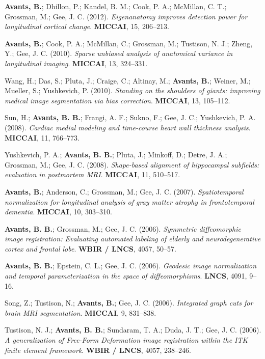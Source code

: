 \documentclass[10pt,letterpaper]{article}
\begin{document}
\begin{enumerate}
{  \item \textbf{Avants, B.}; Dhillon, P.; Kandel, B. M.; Cook, P. A.; McMillan, C. T.; Grossman, M.; Gee, J. C. (2012). \textit{Eigenanatomy improves detection power for longitudinal cortical change}. \textbf{MICCAI}, 15, 206--213.
  \item \textbf{Avants, B.}; Cook, P. A.; McMillan, C.; Grossman, M.; Tustison, N. J.; Zheng, Y.; Gee, J. C. (2010). \textit{Sparse unbiased analysis of anatomical variance in longitudinal imaging}. \textbf{MICCAI}, 13, 324--331.
  \item Wang, H.; Das, S.; Pluta, J.; Craige, C.; Altinay, M.; \textbf{Avants, B.}; Weiner, M.; Mueller, S.; Yushkevich, P. (2010). \textit{Standing on the shoulders of giants: improving medical image segmentation via bias correction}. \textbf{MICCAI}, 13, 105--112.
  \item Sun, H.; \textbf{Avants, B. B.}; Frangi, A. F.; Sukno, F.; Gee, J. C.; Yushkevich, P. A. (2008). \textit{Cardiac medial modeling and time-course heart wall thickness analysis}. \textbf{MICCAI}, 11, 766--773.
  \item Yushkevich, P. A.; \textbf{Avants, B. B.}; Pluta, J.; Minkoff, D.; Detre, J. A.; Grossman, M.; Gee, J. C. (2008). \textit{Shape-based alignment of hippocampal subfields: evaluation in postmortem MRI}. \textbf{MICCAI}, 11, 510--517.
  \item \textbf{Avants, B.}; Anderson, C.; Grossman, M.; Gee, J. C. (2007). \textit{Spatiotemporal normalization for longitudinal analysis of gray matter atrophy in frontotemporal dementia}. \textbf{MICCAI}, 10, 303--310.
  \item \textbf{Avants, B. B.}; Grossman, M.; Gee, J. C. (2006). \textit{Symmetric diffeomorphic image registration: Evaluating automated labeling of elderly and neurodegenerative cortex and frontal lobe}. \textbf{WBIR / LNCS}, 4057, 50--57.
  \item \textbf{Avants, B. B.}; Epstein, C. L.; Gee, J. C. (2006). \textit{Geodesic image normalization and temporal parameterization in the space of diffeomorphisms}. \textbf{LNCS}, 4091, 9--16.
  \item Song, Z.; Tustison, N.; \textbf{Avants, B.}; Gee, J. C. (2006). \textit{Integrated graph cuts for brain MRI segmentation}. \textbf{MICCAI}, 9, 831--838.
  \item Tustison, N. J.; \textbf{Avants, B. B.}; Sundaram, T. A.; Duda, J. T.; Gee, J. C. (2006). \textit{A generalization of Free-Form Deformation image registration within the ITK finite element framework}. \textbf{WBIR / LNCS}, 4057, 238--246.
}
\end{enumerate}
\end{document}

